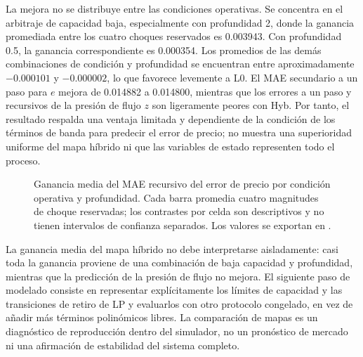 La mejora no se distribuye entre las condiciones operativas. Se concentra en el arbitraje de capacidad baja, especialmente con profundidad 2, donde la ganancia promediada entre los cuatro choques reservados es 0.003943. Con profundidad 0.5, la ganancia correspondiente es 0.000354. Los promedios de las demás combinaciones de condición y profundidad se encuentran entre aproximadamente $-0.000101$ y $-0.000002$, lo que favorece levemente a L0. El MAE secundario a un paso para $e$ mejora de 0.014882 a 0.014800, mientras que los errores a un paso y recursivos de la presión de flujo $z$ son ligeramente peores con Hyb. Por tanto, el resultado respalda una ventaja limitada y dependiente de la condición de los términos de banda para predecir el error de precio; no muestra una superioridad uniforme del mapa híbrido ni que las variables de estado representen todo el proceso.

\begin{figure}[H]
\centering
{}
\caption{Ganancia media del MAE recursivo del error de precio por condición operativa y profundidad. Cada barra promedia cuatro magnitudes de choque reservadas; los contrastes por celda son descriptivos y no tienen intervalos de confianza separados. Los valores se exportan en .}
\label{fig:hybrid-cell-gains}
\end{figure}

La ganancia media del mapa híbrido no debe interpretarse aisladamente: casi toda la ganancia proviene de una combinación de baja capacidad y profundidad, mientras que la predicción de la presión de flujo no mejora. El siguiente paso de modelado consiste en representar explícitamente los límites de capacidad y las transiciones de retiro de LP y evaluarlos con otro protocolo congelado, en vez de añadir más términos polinómicos libres. La comparación de mapas es un diagnóstico de reproducción dentro del simulador, no un pronóstico de mercado ni una afirmación de estabilidad del sistema completo.

